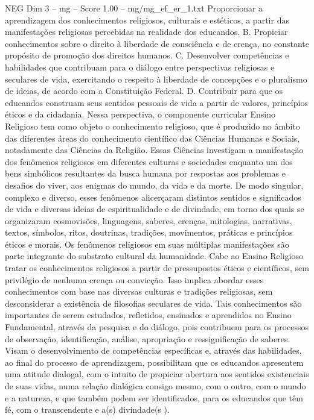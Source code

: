 \begin{textsample}{NEG Dim 3 – mg – Score 1.00 – mg/mg\_ef\_er\_1.txt}
Proporcionar a aprendizagem dos conhecimentos religiosos, culturais e estéticos, a partir das manifestações religiosas percebidas na realidade dos educandos.
B.
Propiciar conhecimentos sobre o direito à liberdade de consciência e de crença, no constante propósito de promoção dos direitos humanos.
C.
Desenvolver competências e habilidades que contribuam para o diálogo entre perspectivas religiosas e seculares de vida, exercitando o respeito à liberdade de concepções e o pluralismo de ideias, de acordo com a Constituição Federal.
D.
Contribuir para que os educandos construam seus sentidos pessoais de vida a partir de valores, princípios éticos e da cidadania.
Nessa perspectiva, o componente curricular Ensino Religioso tem como objeto o conhecimento religioso, que é produzido no âmbito das diferentes áreas do conhecimento científico das Ciências Humanas e Sociais, notadamente das Ciências da Religião.
Essas Ciências investigam a manifestação dos fenômenos religiosos em diferentes culturas e sociedades enquanto um dos bens simbólicos resultantes da busca humana por respostas aos problemas e desafios do viver, aos enigmas do mundo, da vida e da morte.
De modo singular, complexo e diverso, esses fenômenos alicerçaram distintos sentidos e significados de vida e diversas ideias de espiritualidade e de divindade, em torno dos quais se organizaram cosmovisões, linguagens, saberes, crenças, mitologias, narrativas, textos, símbolos, ritos, doutrinas, tradições, movimentos, práticas e princípios éticos e morais.
Os fenômenos religiosos em suas múltiplas manifestações são parte integrante do substrato cultural da humanidade.
Cabe ao Ensino Religioso tratar os conhecimentos religiosos a partir de pressupostos éticos e científicos, sem privilégio de nenhuma crença ou convicção.
Isso implica abordar esses conhecimentos com base nas diversas culturas e tradições religiosas, sem desconsiderar a existência de filosofias seculares de vida.
Tais conhecimentos são importantes de serem estudados, refletidos, ensinados e aprendidos no Ensino Fundamental, através da pesquisa e do diálogo, pois contribuem para os processos de observação, identificação, análise, apropriação e ressignificação de saberes.
Visam o desenvolvimento de competências específicas e, através das habilidades, ao final do processo de aprendizagem, possibilitam que os educandos apresentem uma atitude dialogal, com o intuito de propiciar abertura aos sentidos existenciais de suas vidas, numa relação dialógica consigo mesmo, com o outro, com o mundo e a natureza, e que também podem ser identificados, para os educandos que têm fé, com o transcendente e a(s) divindade(s ).

\end{textsample}
